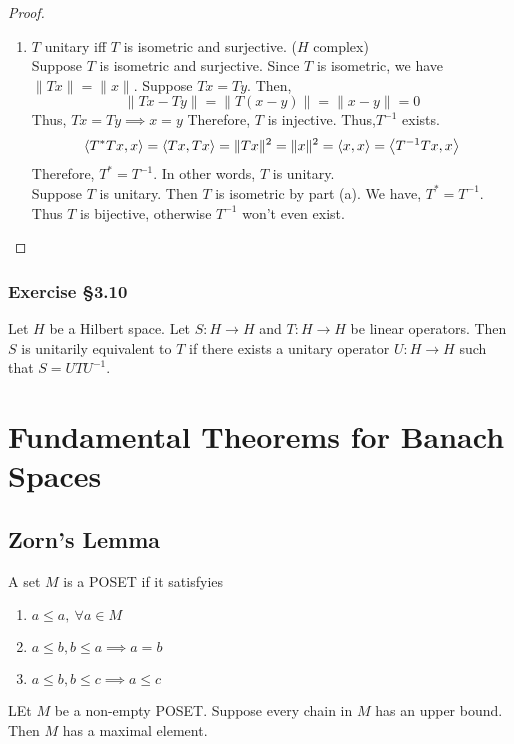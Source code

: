\begin{proof}
\begin{enumerate}
	\hrule \vspace{1em}

	\item $T$ unitary iff $T$ is isometric and surjective. ($H$ complex)\\

		Suppose $T$ is isometric and surjective.
		Since $T$ is isometric, we have $\|Tx\| = \|x\|$.
		Suppose $Tx = Ty$.
		Then,
		\[ \|Tx-Ty\| = \|T(x-y)\| = \|x-y\| = 0 \]
		Thus, $Tx = Ty \implies x = y$
		Therefore, $T$ is injective.
		Thus,$T^{-1}$ exists.
		\[ \left\langle T^\ast Tx,x \right\rangle = \left\langle Tx,Tx \right\rangle = \|Tx\|^2 = \|x\|^2 = \left\langle x,x \right\rangle = \left\langle T^{-1}T x,x \right\rangle \]
		Therefore, $T^\ast = T^{-1}$.
		In other words, $T$ is unitary.\\

		Suppose $T$ is unitary.
		Then $T$ is isometric by part (a).
		We have, $T^\ast = T^{-1}$.
		Thus $T$ is bijective, otherwise $T^{-1}$ won't even exist.
	\end{enumerate}
\end{proof}

\subsubsection{Exercise \S3.10}
\begin{definition}
	Let $H$ be a Hilbert space.
	Let $S : H \to H$ and $T : H \to H$ be linear operators.
	Then $S$ is unitarily equivalent to $T$ if there exists a unitary operator $U : H \to H$ such that $S = UTU^{-1}$.
\end{definition}

\section{Fundamental Theorems for Banach Spaces}
\subsection{Zorn's Lemma}
\begin{definition}[POSET]
	A set $M$ is a POSET if it satisfyies
	\begin{enumerate}
		\item $a \le a,\ \forall a \in M$
		\item $a \le b, b \le a \implies a = b$
		\item $a \le b, b \le c \implies a \le c$
	\end{enumerate}
\end{definition}
\begin{lemma}[Zorn]
	LEt $M$ be a non-empty POSET.
	Suppose every chain in $M$ has an upper bound.
	Then $M$ has a maximal element.
\end{lemma}

